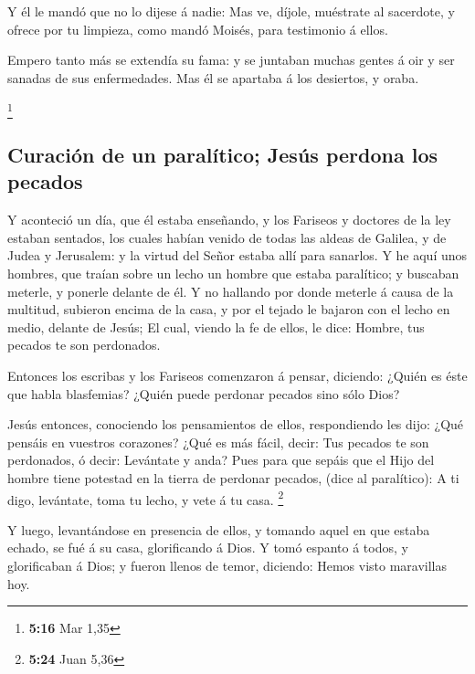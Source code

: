  Y él le mandó que no lo dijese á nadie: Mas ve, díjole,
muéstrate al sacerdote, y ofrece por tu limpieza, como mandó Moisés,
para testimonio á ellos.

 Empero tanto más se extendía su fama: y se juntaban
muchas gentes á oir y ser sanadas de sus enfermedades. 
Mas él se apartaba á los desiertos, y oraba.

\footnote{\textbf{5:16} Mar 1,35}

\hypertarget{curaciuxf3n-de-un-paraluxedtico-jesuxfas-perdona-los-pecados}{%
\subsection{Curación de un paralítico; Jesús perdona los
pecados}\label{curaciuxf3n-de-un-paraluxedtico-jesuxfas-perdona-los-pecados}}

 Y aconteció un día, que él estaba enseñando, y los
Fariseos y doctores de la ley estaban sentados, los cuales habían venido
de todas las aldeas de Galilea, y de Judea y Jerusalem: y la virtud del
Señor estaba allí para sanarlos.  Y he aquí unos hombres,
que traían sobre un lecho un hombre que estaba paralítico; y buscaban
meterle, y ponerle delante de él.  Y no hallando por
donde meterle á causa de la multitud, subieron encima de la casa, y por
el tejado le bajaron con el lecho en medio, delante de Jesús;
 El cual, viendo la fe de ellos, le dice: Hombre, tus
pecados te son perdonados.

 Entonces los escribas y los Fariseos comenzaron á
pensar, diciendo: ¿Quién es éste que habla blasfemias? ¿Quién puede
perdonar pecados sino sólo Dios?

 Jesús entonces, conociendo los pensamientos de ellos,
respondiendo les dijo: ¿Qué pensáis en vuestros corazones?
 ¿Qué es más fácil, decir: Tus pecados te son perdonados,
ó decir: Levántate y anda?  Pues para que sepáis que el
Hijo del hombre tiene potestad en la tierra de perdonar pecados, (dice
al paralítico): A ti digo, levántate, toma tu lecho, y vete á tu casa.
\footnote{\textbf{5:24} Juan 5,36}

 Y luego, levantándose en presencia de ellos, y tomando
aquel en que estaba echado, se fué á su casa, glorificando á Dios.
 Y tomó espanto á todos, y glorificaban á Dios; y fueron
llenos de temor, diciendo: Hemos visto maravillas hoy.

